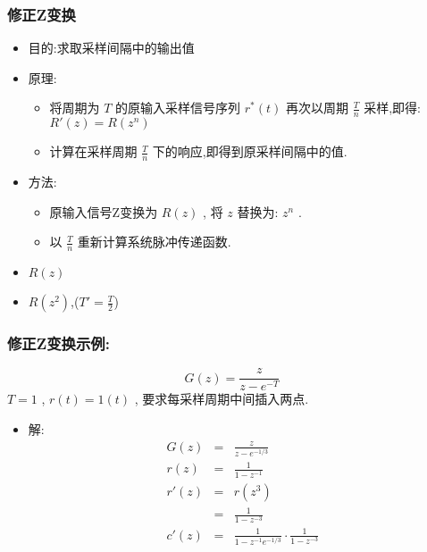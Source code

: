 \documentclass[table]{article}
\begin{document}
\begin{frame}
\frametitle{修正Z变换}
\label{sec-4-5-2}

\begin{itemize}
\item 目的:求取采样间隔中的输出值
\item 原理:
\begin{itemize}
\item <2->将周期为  $T$  的原输入采样信号序列 $r^*(t)$ 再次以周期  $\frac{T}{n}$  采样,即得:  $R'(z)=R(z^n)$
\item <3->计算在采样周期  $\frac{T}{n}$  下的响应,即得到原采样间隔中的值.
\end{itemize}
\item 方法:
\begin{itemize}
\item <4->原输入信号Z变换为  $R(z)$ , 将 $z$  替换为:  $z^n$  .
\item <5->以  $\frac{T}{n}$ 重新计算系统脉冲传递函数.
\end{itemize}
\end{itemize}
\begin{itemize}

\item $R(z)$
\label{sec-4-5-2-1}%

\item $R(z^2)$,($T'=\frac{T}{2}$)
\label{sec-4-5-2-2}%
\end{itemize} %
\end{frame}
\begin{frame}
\frametitle{修正Z变换示例:}
\label{sec-4-5-3}

\[G(z)=\frac{z}{z-e^{-T}}\]
   $T=1$ ,  $r(t)=1(t)$ , 要求每采样周期中间插入两点.

\begin{itemize}
\item 解:
      \begin{eqnarray*}
      G(z) &= & \frac{z}{z-e^{-1/3}} \\
      r(z) &=& \frac{1}{1-z^{-1}} \\
      r'(z) &=& r(z^3) \\
      &=& \frac{1}{1-z^{-3}} \\
      c'(z) &=& \frac{1}{1-z^{-1}e^{-1/3}}\cdot\frac{1}{1-z^{-3}}
      \end{eqnarray*}
\end{itemize}
\end{frame}
\end{document}
